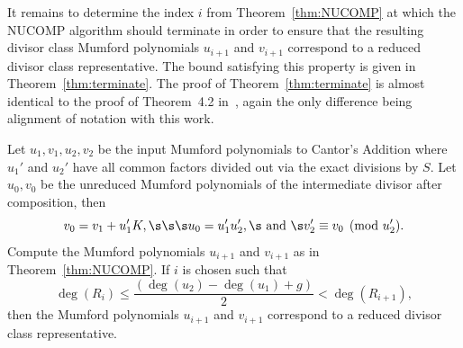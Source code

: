It remains to determine the index $i$ from Theorem~\ref{thm:NUCOMP} at which the
NUCOMP algorithm should terminate in order to ensure that the resulting divisor
class Mumford polynomials $u_{i+1}$ and $v_{i+1}$ correspond to a reduced
divisor class representative. The bound satisfying this property is given in
Theorem~\ref{thm:terminate}. The proof of Theorem~\ref{thm:terminate} is almost
identical to the proof of Theorem~4.2
in~\cite{ImbertJacobsonSchmidt_NUCOMP_2010}, again the only difference being
alignment of notation with this work. 

\bt\label{thm:terminate}
\cite[Adapted from Theorem~4.2]{ImbertJacobsonSchmidt_NUCOMP_2010} 
Let $u_1,v_1, u_2,v_2$ be the input Mumford polynomials to Cantor's Addition
where $u_1'$ and $u_2'$ have all common factors divided out via the exact
divisions by $S$. Let $u_0,v_0$ be the unreduced Mumford polynomials of the
intermediate divisor after composition, then
\begin{equation*}
v_0 = v_1 + u_1'K, \s\s\s u_0 = u_1'u_2', \s\mbox{ and }\s v_2' \equiv v_0 \pmod{u_2'}.
\end{equation*} Compute the Mumford polynomials $u_{i+1}$ and $v_{i+1}$ as in 
Theorem~\ref{thm:NUCOMP}. If $i$ is chosen such that $$\deg(R_i) \leq \frac{(\deg(u_2)
- \deg(u_1) + g)}{2} < \deg(R_{i+1}),$$ then the Mumford polynomials
$u_{i+1}$ and $v_{i+1}$ correspond to a reduced divisor class representative.
\et


